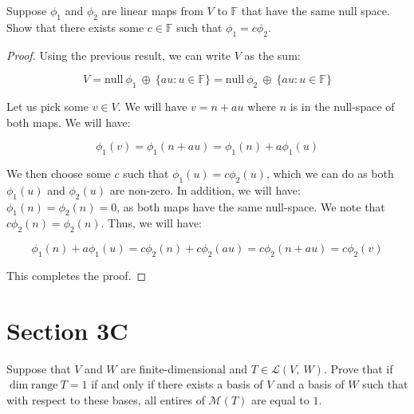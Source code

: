 \documentclass[10pt, oneside]{article}
\newenvironment{problem}[2][Problem]{\begin{trivlist}
\item[\hskip \labelsep {\bfseries #1}\hskip \labelsep {\bfseries #2.}]}{\end{trivlist}}
\begin{document}
    \begin{problem}{3.30}

      Suppose $\phi_1$ and $\phi_2$ are linear maps from $V$ to $\mathbb{F}$ that have the same null space. Show that there exists
      some $c \in \mathbb{F}$ such that $\phi_1 = c\phi_2$.

    \end{problem}

    \begin{proof}

      Using the previous result, we can write $V$ as the sum:

      $$V = \text{null} \ \phi_1 \ \oplus \ \{au : u \in \mathbb{F}\} = \text{null} \ \phi_2 \ \oplus \ \{au : u \in \mathbb{F}\}$$

      Let us pick some $v \in V$. We will have $v = n + au$ where $n$ is in the null-space of both maps. We will have:

      $$\phi_1(v) = \phi_1(n + au) = \phi_1(n) + a\phi_1(u)$$

      We then choose some $c$ such that $\phi_1(u) = c \phi_2(u)$, which we can do as both $\phi_1(u)$ and $\phi_2(u)$ are non-zero. In addition, we will have:
      $\phi_1(n) = \phi_2(n) = 0$, as both maps have the same null-space. We note that $c \phi_2(n) = \phi_2(n)$. Thus, we will have:

      $$\phi_1(n) + a\phi_1(u) = c \phi_2(n) + c \phi_2(au) = c \phi_2(n + au) = c \phi_2(v)$$

      This completes the proof.

    \end{proof}

    \section{Section 3C}

    \begin{problem}{3.6}

      Suppose that $V$ and $W$ are finite-dimensional and $T \in \mathcal{L}(V, \ W)$. Prove that if $\dim \text{range} \ T = 1$ if and only if
      there exists a basis of $V$ and a basis of $W$ such that with respect to these bases, all entires of $\mathcal{M}(T)$ are equal to $1$.

    \end{problem}
\end{document}
